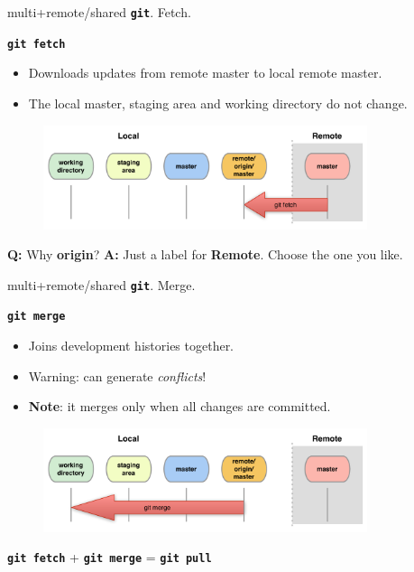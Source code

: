 \documentclass{beamer}
\newcommand{\git}{\texttt{\textbf{git}}\xspace}
\begin{document}
\begin{frame}{multi+remote/shared \git. Fetch.}
  \begin{center}
    \texttt{\textbf{git fetch}}
  \end{center}
  \begin{itemize}
  \item Downloads updates from remote master to local remote master.
  \item The local master, staging area and working directory do not
    change.
  \end{itemize}
  \begin{figure}
    \centering
    \includegraphics[width=9.5cm]{figs/local-remote-fetch}
  \end{figure}
  \begin{block}{\small{\textbf{Q:} Why \textbf{origin}?}}
      \small{\textbf{A:} Just a label for \textbf{Remote}. Choose the one you like.}
  \end{block}
\end{frame}


\begin{frame}{multi+remote/shared \git. Merge.}
  \begin{center}
    \texttt{\textbf{git merge}}
  \end{center}
  \begin{itemize}
  \item Joins development histories together.
  \item \alert{Warning}: can generate \emph{conflicts}!
  \item \textbf{Note}: it merges only when all changes are committed.
  \end{itemize}
  \begin{figure}
    \centering
    \includegraphics[width=9.5cm]{figs/local-remote-merge}
  \end{figure}
  \begin{center}
    \texttt{\textbf{git fetch}} + \texttt{\textbf{git merge}} = \texttt{\textbf{git pull}}
  \end{center}
\end{frame}
\end{document}
